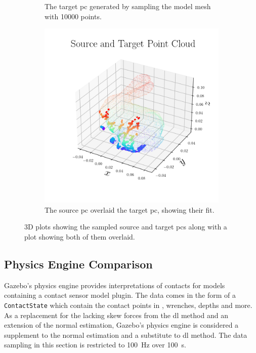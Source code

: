 \begin{figure}[!h]
\begin{subfigure}[b]{0.3\textwidth}
		\caption{The target \gls{pc} generated by sampling the model mesh with \num{10 000} points.}
		\label{fig:pc-target}
	\end{subfigure}
	\begin{subfigure}[b]{0.3\textwidth}
		\centering
		\includegraphics[width=\textwidth]{chapters/1-tactile-perception/fig/matplotlib/pc_source_target.png}
		\caption{The source \gls{pc} overlaid the target \gls{pc}, showing their fit.}
		\label{fig:pc-source-and-target}
	\end{subfigure}
	\caption{3D plots showing the sampled source and target \gls{pc}s along with a plot showing both of them overlaid.}
	\label{fig:contact-position-gazebo}
\end{figure}

\subsection{Physics Engine Comparison}\label{sec:1-tactile-perception-results-gazebo-comparison}

Gazebo's physics engine provides interpretations of contacts for models containing a contact sensor model plugin. The data comes in the form of a \texttt{ContactState} which contain the contact points in , wrenches, depths and more. As a replacement for the lacking skew forces from the \gls{dl} method and an extension of the normal estimation, Gazebo's physics engine is considered a supplement to the normal estimation and a substitute to \gls{dl} method. The data sampling in this section is restricted to \SI{100}{\hertz} over \SI{100}{\second}. \medskip

